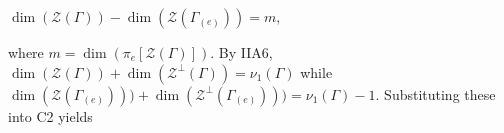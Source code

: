 $\dim(\mathcal{Z}(\Gamma)) - \dim(\mathcal{Z}(\Gamma_{(e)})) = m,$

where $m = \dim(\pi_{e}[\mathcal{Z}(\Gamma)])$. By IIA6, $\dim(\mathcal{Z}(\Gamma)) + \dim(\mathcal{Z}^{\perp}(\Gamma)) = \nu_{1}(\Gamma)$
while $\dim(\mathcal{Z}(\Gamma_{(e)}))) + \dim(\mathcal{Z}^{\perp}(\Gamma_{(e)}))) = \nu_{1}(\Gamma) - 1$. Substituting these into C2 yields
